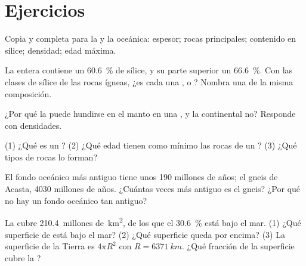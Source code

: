 \section{Ejercicios}

\begin{exercise}[$\star$]\label{exo:g12:continental-crust:1}
Copia y completa para la  y la oceánica: espesor; rocas
principales; contenido en sílice; densidad; edad máxima.
\end{exercise}

\begin{exercise}[$\star$]\label{exo:g12:continental-crust:2}
La  entera contiene un \qty{60.6}{\percent} de sílice, y su
parte superior un \qty{66.6}{\percent}. Con las clases de sílice de las rocas
ígneas, ¿es cada una ,  o ? Nombra una 
de la misma composición.
\end{exercise}

\begin{exercise}[$\star$]\label{exo:g12:continental-crust:3}
¿Por qué la  puede hundirse en el manto en una , y la continental no? Responde con densidades.
\end{exercise}

\begin{exercise}[$\star$]\label{exo:g12:continental-crust:4}
(1) ¿Qué es un ? (2) ¿Qué edad tienen como mínimo las rocas de un
? (3) ¿Qué tipos de rocas lo forman?
\end{exercise}

\begin{exercise}[$\star$]\label{exo:g12:continental-crust:5}
El fondo oceánico más antiguo tiene unos 190 millones de años; el gneis de
Acasta, 4030 millones de años. ¿Cuántas veces más antiguo es el gneis? ¿Por
qué no hay un fondo oceánico tan antiguo?
\end{exercise}

\begin{exercise}[$\star\star$]\label{exo:g12:continental-crust:6}
La  cubre \num{210.4}~millones de~\unit{km^2}, de los que
el \qty{30.6}{\percent} está bajo el mar. (1) ¿Qué superficie de  está bajo el mar? (2) ¿Qué superficie queda por encima? (3) La
superficie de la Tierra es $4\pi R^2$ con $R = \qty{6371}{km}$. ¿Qué fracción
de la superficie cubre la ?
\end{exercise}

